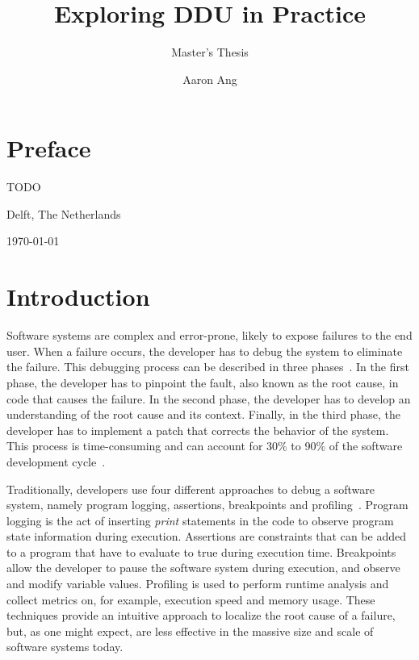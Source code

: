 \documentclass[twoside,a4paper,11pt]{memoir}
\title{Exploring DDU in Practice}
\subtitle{Master's Thesis}
\author{Aaron Ang}
\begin{document}
\frontmatter
\thispagestyle{empty}
\maketitle
{}

\chapter{Preface}%
\label{ch:preface}

TODO

\vspace{1cm}
\begin{flushright}
\theauthor%

Delft, The Netherlands

\today%
\end{flushright}

\cleardoublepage\tableofcontents
\cleardoublepage\listoffigures
\cleardoublepage\mainmatter%

\chapter{Introduction}%
\label{ch:introduction}
Software systems are complex and error-prone, likely to expose failures to the end user.
When a failure occurs, the developer has to debug the system to eliminate the failure.
This debugging process can be described in three phases~\cite{Parnin:2011:ADT:2001420.2001445}.
In the first phase, the developer has to pinpoint the fault, also known as the root cause, in code that causes the failure.
In the second phase, the developer has to develop an understanding of the root cause and its context.
Finally, in the third phase, the developer has to implement a patch that corrects the behavior of the system.
This process is time-consuming and can account for 30\% to 90\% of the software development cycle~\cite{robbins2003debugging, beizer2003software, britton2013reversible}.

Traditionally, developers use four different approaches to debug a software system, namely program logging, assertions, breakpoints and profiling~\cite{wong2016survey}.
Program logging is the act of inserting \emph{print} statements in the code to observe program state information during execution.
Assertions are constraints that can be added to a program that have to evaluate to true during execution time.
Breakpoints allow the developer to pause the software system during execution, and observe and modify variable values.
Profiling is used to perform runtime analysis and collect metrics on, for example, execution speed and memory usage.
These techniques provide an intuitive approach to localize the root cause of a failure, but, as one might expect, are less effective in the massive size and scale of software systems today.
\end{document}
